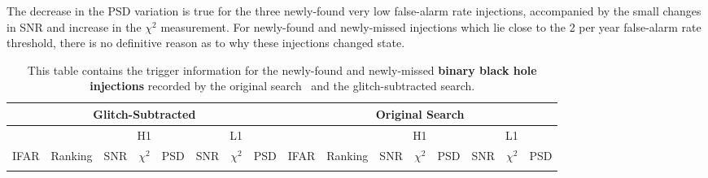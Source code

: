 The decrease in the PSD variation is true for the three newly-found very low false-alarm rate injections, accompanied by the small changes in SNR and increase in the $\chi^{2}$ measurement. For newly-found and newly-missed injections which lie close to the 2 per year false-alarm rate threshold, there is no definitive reason as to why these injections changed state.

\newpage
{} %
\begin{landscape}
\begin{table}[tb]
\centering
\caption{\label{4:tab:apdx_changed_snr_bbh}This table contains the trigger information for the newly-found and newly-missed \textbf{binary black hole injections} recorded by the original search~\cite{gwtc3:2023} and the glitch-subtracted search.} 
\begin{tabular}{|c|c|c|c|c|c|c|c||c|c|c|c|c|c|c|c|}
\hline
\multicolumn{8}{|c||}{Glitch-Subtracted} & \multicolumn{8}{c|}{Original Search} \\
\hline
\multicolumn{2}{|c|}{} & \multicolumn{3}{c|}{H1} & \multicolumn{3}{c||}{L1} & \multicolumn{2}{c|}{} & \multicolumn{3}{c|}{H1} & \multicolumn{3}{c|}{L1}\\
\hline
IFAR & Ranking & SNR & $\chi^{2}$ & PSD & SNR & $\chi^{2}$ & PSD & IFAR & Ranking & SNR & $\chi^{2}$ & PSD & SNR & $\chi^{2}$ & PSD \\ &


\end{tabular}
\end{table}
\end{landscape}
